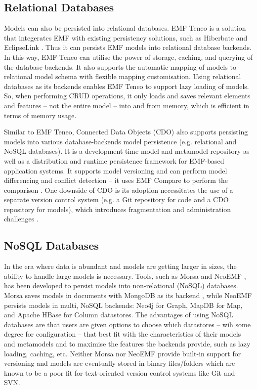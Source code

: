 \subsection{Relational Databases}
\label{sec:relational_databases}
Models can also be persisted into relational databases. EMF Teneo \cite{eclipse2017teneo} is a solution that integerates EMF with existing persistency solutions, such as Hiberbate \cite{hibernate2019hibernateorm} and EclipseLink \cite{eclipse2019eclipselink}. Thus it can persists EMF models into relational database backends. In this way, EMF Teneo can utilise the power of storage, caching, and querying of the database backends. It also supports the automatic mapping of models to relational model schema with flexible mapping customisation. Using relational databases as its backends enables EMF Teneo to support lazy loading of models. So, when performing CRUD operations, it only loads and saves relevant elements and features -- not the entire model -- into and from memory, which is efficient in terms of memory usage.

Similar to EMF Teneo, Connected Data Objects (CDO) \cite{eclipse2019cdo} also supports persisting models into various database-backends model persistence (e.g. relational and NoSQL databases). It is a development-time model and metamodel repository as well as a distribution and runtime persistence framework for EMF-based application systems. It supports model versioning and can perform model differencing and conflict detection -- it uses EMF Compare \cite{emfcompare2018developer} to perform the comparison \cite{cdo2019emfcompare}. One downside of CDO is its adoption necessitates the use of a separate version control system (e.g. a Git repository for code and a CDO repository for models), which introduces fragmentation and administration challenges \cite{barmpis2014evaluation}.

\subsection{NoSQL Databases}
\label{sec:NoSQL Databases}
In the era where data is abundant and models are getting larger in sizes, the ability to handle large models is necessary. Tools, such as Morsa \cite{DBLP:conf/models/Espinazo-PaganCM11} and NeoEMF \cite{daniel2016neoemf}, has been developed to persist models into non-relational (NoSQL) databases. Morsa saves models in documents with MongoDB as its backend \cite{mongodb}, while NeoEMF persists models in multi, NoSQL backends: Neo4j \cite{neo4j2019neo4j} for Graph, MapDB \cite{mapdb2019mapdb} for Map, and Apache HBase \cite{apache2019hbase} for Column datastores. The advantages of using NoSQL databases are that users are given options to choose which datastores -- wih some degree for configuration -- that best fit with the characteristics of their models and metamodels and to maximise the features  the backends provide, such as lazy loading, caching, etc. Neither Morsa nor NeoEMF provide built-in support for versioning and models are eventually stored in binary files/folders which are known to be a poor fit for text-oriented version control systems like Git and SVN. 

